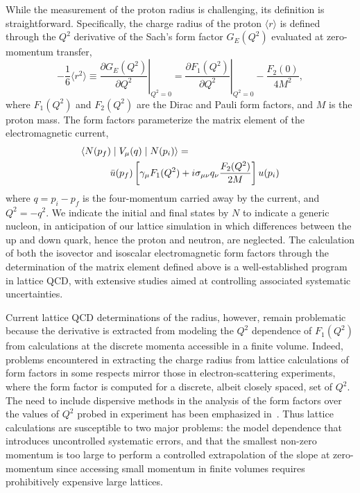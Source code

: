 \documentclass[prd,aps,twocolumn,superscriptaddress,tightenlines,nofootinbib,floatfix,preprintnumbers,10pt]{revtex4-1}
\begin{document}
While the measurement of the proton radius is challenging, its definition is straightforward. 
Specifically, the charge radius of the proton $\langle r \rangle$ is defined through the $Q^2$
derivative of the Sach's form factor $G_E(Q^2)$
evaluated at zero-momentum transfer,
\begin{equation}
-\frac{1}{6} \langle r^2 \rangle \equiv \left. \frac{\partial G_E(Q^2)}{\partial Q^2} \right|_{Q^2=0} 
= \left. \frac{\partial F_1(Q^2)}{\partial Q^2} \right|_{Q^2=0} - \frac{F_2(0)}{4 M^2}
\label{eq:radius},
\end{equation}
where $F_1(Q^2)$ and $F_2(Q^2)$ are the Dirac and Pauli form factors,
and $M$ is the proton mass.
The form factors parameterize the matrix element of the electromagnetic current,
\begin{eqnarray}
\lefteqn{\langle N(p_f) \mid V_{\mu}(q) \mid N(p_i) \rangle
  =} \nonumber \\
& &\qquad  \bar{u}(p_f) \left[ \gamma_\mu F_1(Q^2)  + i\sigma_{\mu\nu}
    q_\nu \frac{F_2(Q^2)}{2 M} \right] u(p_i)
\label{eq:VmuME}
\end{eqnarray}
where $q = p_i - p_f$ is the four-momentum carried away by the current, and $Q^2 = -q^2$.  
%
We indicate the initial and final states by $N$ to indicate a generic nucleon,
in anticipation of our lattice simulation in which differences between the up and down quark,
hence the proton and neutron, are neglected.
%
The calculation of both the isovector and isoscalar electromagnetic form factors through the
determination of the matrix element defined above is a well-established program in lattice QCD, 
with extensive studies aimed at controlling associated systematic uncertainties.

Current lattice QCD determinations of the radius, however, remain problematic because the derivative is extracted from modeling the $Q^2$ dependence of $F_1(Q^2)$ from calculations at the discrete momenta accessible in a finite volume.  
Indeed, problems encountered in extracting the charge radius from lattice calculations of form factors in some respects mirror those in electron-scattering experiments, 
where the form factor is computed for a discrete, albeit closely spaced, set of $Q^2$.
The need to include dispersive methods in the analysis of the form factors over the values of $Q^2$ probed in experiment has been emphasized in~\cite{Alarcon:2018irp}.  
Thus lattice calculations are susceptible to two major problems: 
the model dependence that introduces uncontrolled systematic errors, 
and that the smallest non-zero momentum is too large to perform a controlled extrapolation of the slope at zero-momentum since accessing small momentum in finite volumes requires prohibitively expensive large lattices.
\end{document}
